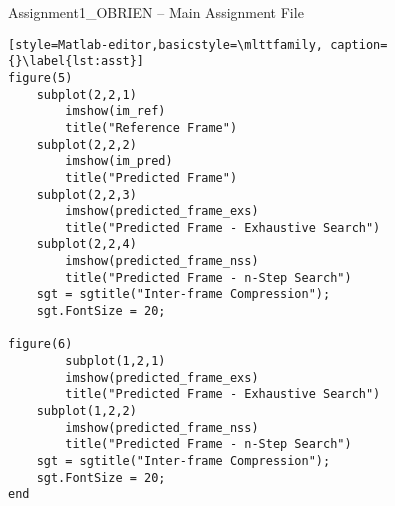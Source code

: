 \begin{codeblock}{Assignment1\_OBRIEN -- Main Assignment File}
\begin{lstlisting}[style=Matlab-editor,basicstyle=\mlttfamily, caption={}\label{lst:asst}]
figure(5)
    subplot(2,2,1)
        imshow(im_ref)
        title("Reference Frame")
    subplot(2,2,2)
        imshow(im_pred)
        title("Predicted Frame")
    subplot(2,2,3)
        imshow(predicted_frame_exs)
        title("Predicted Frame - Exhaustive Search")
    subplot(2,2,4)
        imshow(predicted_frame_nss)
        title("Predicted Frame - n-Step Search")
    sgt = sgtitle("Inter-frame Compression");
    sgt.FontSize = 20;

figure(6)
        subplot(1,2,1)
        imshow(predicted_frame_exs)
        title("Predicted Frame - Exhaustive Search")
    subplot(1,2,2)
        imshow(predicted_frame_nss)
        title("Predicted Frame - n-Step Search")
    sgt = sgtitle("Inter-frame Compression");
    sgt.FontSize = 20;
end  
    \end{lstlisting}
\end{codeblock}